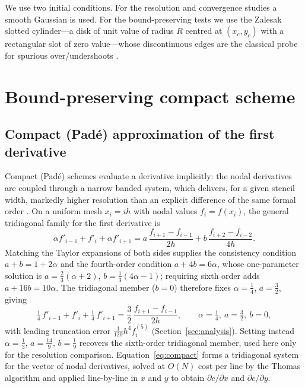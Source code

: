 \documentclass[Journal]{ascelike}   %
\begin{document}
We use two initial conditions. For the resolution and convergence studies a smooth
Gaussian is used. For the bound-preserving tests we use the Zalesak slotted
cylinder---a disk of unit value of radius $R$ centred at $(x_c,y_c)$ with a
rectangular slot of zero value---whose discontinuous edges are the classical probe
for spurious over/undershoots \citep{zalesak1979}.

\section{Bound-preserving compact scheme}
\label{sec:scheme}

\subsection{Compact (Pad\'e) approximation of the first derivative}
\label{sec:compact1}
Compact (Pad\'e) schemes evaluate a derivative implicitly: the nodal derivatives
are coupled through a narrow banded system, which delivers, for a given stencil
width, markedly higher resolution than an explicit difference of the same formal
order \citep{lele1992}. On a uniform mesh $x_i=i h$ with nodal values
$f_i=f(x_i)$, the general tridiagonal family for the first derivative is
\begin{equation}
\alpha f'_{i-1}+f'_{i}+\alpha f'_{i+1}
=a\,\frac{f_{i+1}-f_{i-1}}{2h}+b\,\frac{f_{i+2}-f_{i-2}}{4h}.
\label{eq:compactfam}
\end{equation}
Matching the Taylor expansions of both sides supplies the consistency condition
$a+b=1+2\alpha$ and the fourth-order condition $a+4b=6\alpha$, whose one-parameter
solution is $a=\tfrac23(\alpha+2)$, $b=\tfrac13(4\alpha-1)$; requiring sixth order
adds $a+16b=10\alpha$. The tridiagonal member ($b=0$) therefore fixes
$\alpha=\tfrac14$, $a=\tfrac32$, giving
\begin{equation}
\tfrac14\,f'_{i-1}+f'_{i}+\tfrac14\,f'_{i+1}
=\frac{3}{2}\,\frac{f_{i+1}-f_{i-1}}{2h},
\qquad \alpha=\tfrac14,\ a=\tfrac32,\ b=0,
\label{eq:compact}
\end{equation}
with leading truncation error $\tfrac{1}{120}h^{4}f^{(5)}_i$ (Section~\ref{sec:analysis}).
Setting instead $\alpha=\tfrac13,\,a=\tfrac{14}{9},\,b=\tfrac19$ recovers the
sixth-order tridiagonal member, used here only for the resolution comparison.
Equation~\eqref{eq:compact} forms a tridiagonal system for the vector of nodal
derivatives, solved at $O(N)$ cost per line by the Thomas algorithm and applied
line-by-line in $x$ and $y$ to obtain $\partial c/\partial x$ and
$\partial c/\partial y$.
\end{document}
